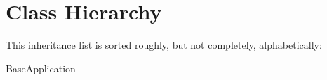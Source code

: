 \section{Class Hierarchy}
This inheritance list is sorted roughly, but not completely, alphabetically\+:\begin{DoxyCompactList}
\item Base\+Application\begin{DoxyCompactList}
\item {}
\end{DoxyCompactList}
\end{DoxyCompactList}
